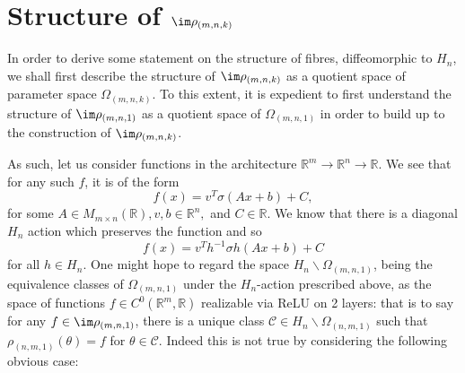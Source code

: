 \documentclass[11pt,letterpaper]{amsart}
\begin{document}
\section{Structure of $\im \rho_{(m ,n, k)}$}\label{section:mn1case}
\par In order to derive some statement on the structure of fibres, diffeomorphic to $H_n$, we shall first describe the structure of $\im\rho_{(m,n,k)}$ as a quotient space of parameter space $\Omega_{(m,n,k)}$. To this extent, it is expedient to first understand the structure of $\im\rho_{(m,n,1)}$ as a quotient space of $\Omega_{(m,n,1)}$ in order to build up to the construction of $\im\rho_{(m,n,k)}$. 
\par As such, let us consider functions in the architecture $\mathbb{R}^m\rightarrow \mathbb{R}^n\rightarrow \mathbb{R}$. We see that for any such $f$, it is of the form
$$
f(x) = v^T\sigma (Ax+b) + C,
$$
for some $A\in M_{m\times n}(\mathbb{R}), v, b\in \mathbb{R}^n,$ and $C\in\mathbb{R}$. We know that there is a diagonal $H_n$ action which preserves the function and so 
$$
f(x) = v^Th^{-1}\sigma h(Ax+b) + C
$$
for all $h\in H_n$. One might hope to regard the space $H_n\backslash \Omega_{(m, n, 1)}$, being the equivalence classes of $\Omega_{(m, n, 1)}$ under the $H_n$-action prescribed above, as the space of functions $f\in C^0(\mathbb{R}^m, \mathbb{R})$ realizable via ReLU on 2 layers: that is to say for any $f\in \im \rho_{(m, n, 1)}$, there is a unique class $\mathcal{C}\in H_n\backslash \Omega_{(n, m, 1)}$ such that $\rho_{(n, m, 1)}(\theta)=f$ for $\theta\in \mathcal{C}$. Indeed this is not true by considering the following obvious case: 
\end{document}
